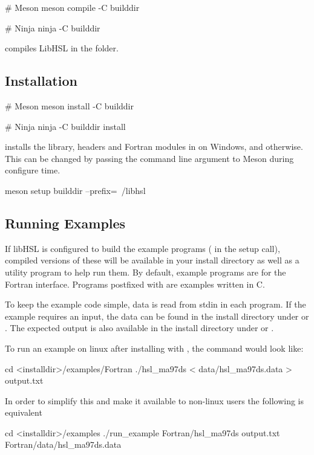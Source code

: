 \documentclass[gdweb]{geradwp}
\renewcommand{\_}{\raisebox{+0.35mm}{\textunderscore}}
\newcommand{\LibHSL}{LibHSL\xspace}
\begin{document}
\begin{jllisting}
# Meson
meson compile -C builddir

# Ninja
ninja -C builddir
\end{jllisting}
compiles \LibHSL in the  folder.

\subsection{Installation}

\begin{jllisting}
# Meson
meson install -C builddir

# Ninja
ninja -C builddir install
\end{jllisting}
installs the library, headers and Fortran modules in  on Windows, and  otherwise.
This can be changed by passing the command line argument  to Meson during configure time.
\begin{jllisting}
meson setup builddir --prefix=~/libhsl
\end{jllisting}

\subsection{Running Examples}

If libHSL is configured to build the example programs ( in the setup call),
compiled versions of these will be available in your install directory as well as a utility program 
to help run them.
By default, example programs are for the Fortran interface.
Programs postfixed with  are examples written in C.

To keep the example code simple, data is read from stdin in each program.
If the example requires an input, the data can be found in the install directory under  or .
The expected output is also available in the install directory under  or .

To run an example on linux after installing with , the command would look like:
\begin{jllisting}
cd <installdir>/examples/Fortran
./hsl_ma97ds < data/hsl_ma97ds.data > output.txt
\end{jllisting}
In order to simplify this and make it available to non-linux users the following is equivalent
\begin{jllisting}
cd <installdir>/examples
./run_example Fortran/hsl_ma97ds output.txt Fortran/data/hsl_ma97ds.data
\end{jllisting}
\end{document}

